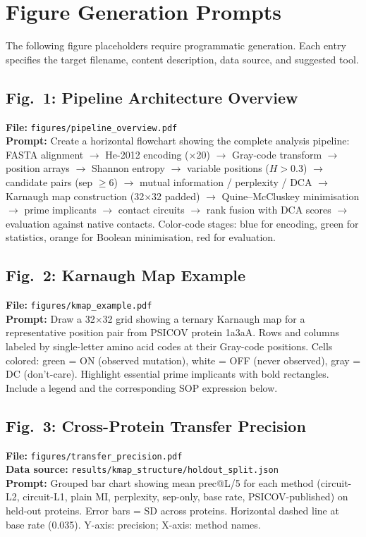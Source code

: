 
\section{Figure Generation Prompts}
\label{app:prompts}

The following figure placeholders require programmatic generation.
Each entry specifies the target filename, content description,
data source, and suggested tool.

\subsection*{Fig.~1: Pipeline Architecture Overview}
\textbf{File:} \texttt{figures/pipeline\_overview.pdf}\\
\textbf{Prompt:} Create a horizontal flowchart showing the complete analysis pipeline:
FASTA alignment $\to$ He-2012 encoding ($\times$20) $\to$ Gray-code transform $\to$
position arrays $\to$ Shannon entropy $\to$ variable positions ($H > 0.3$) $\to$
candidate pairs (sep $\geq 6$) $\to$ mutual information / perplexity / DCA $\to$
Karnaugh map construction (32$\times$32 padded) $\to$ Quine--McCluskey
minimisation $\to$ prime implicants $\to$ contact circuits $\to$ rank fusion
with DCA scores $\to$ evaluation against native contacts.
Color-code stages: blue for encoding, green for statistics, orange for
Boolean minimisation, red for evaluation.

\subsection*{Fig.~2: Karnaugh Map Example}
\textbf{File:} \texttt{figures/kmap\_example.pdf}\\
\textbf{Prompt:} Draw a 32$\times$32 grid showing a ternary Karnaugh map for
a representative position pair from PSICOV protein 1a3aA.  Rows and columns
labeled by single-letter amino acid codes at their Gray-code positions.
Cells colored: green = ON (observed mutation), white = OFF (never observed),
gray = DC (don't-care).  Highlight essential prime implicants with bold
rectangles.  Include a legend and the corresponding SOP expression below.

\subsection*{Fig.~3: Cross-Protein Transfer Precision}
\textbf{File:} \texttt{figures/transfer\_precision.pdf}\\
\textbf{Data source:} \texttt{results/kmap\_structure/holdout\_split.json}\\
\textbf{Prompt:} Grouped bar chart showing mean prec@L/5 for each method
(circuit-L2, circuit-L1, plain MI, perplexity, sep-only, base rate,
PSICOV-published) on held-out proteins.  Error bars = SD across proteins.
Horizontal dashed line at base rate (0.035).  Y-axis: precision; X-axis:
method names.

